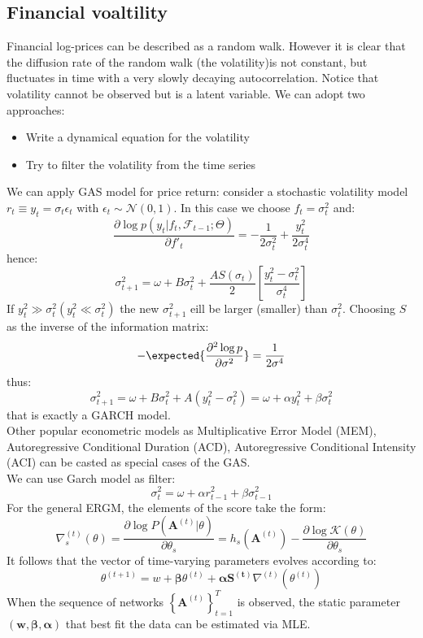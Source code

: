 \subsection{Financial voaltility}
Financial log-prices can be described as a random walk. However it is clear that the diffusion rate of the random walk (the volatility)is not constant, but fluctuates in time with a very slowly decaying autocorrelation. Notice that volatility cannot be observed but is a latent variable. We can adopt two approaches:
\begin{itemize}
	\item Write a dynamical equation for the volatility
	\item Try to filter the volatility from the time series
\end{itemize}
We can apply GAS model for price return: consider a stochastic volatility model $r_t \equiv y_t = \sigma_t \epsilon_t$ with $\epsilon_t \sim \mathcal{N}(0,1)$. In this case we choose $f_t = \sigma_t^2$ and:
\[
\frac{\partial \log p(y_t| f_t, \mathcal{F}_{t-1};\Theta)}{\partial f'_t} = - \frac{1}{2 \sigma^2_t} + \frac{y_t^2}{2 \sigma_t^4}
\]
hence:
\[
\sigma^2_{t+1} = \omega + B \sigma_t^2 + \frac{AS(\sigma_t)}{2}\left[\frac{y_t^2 - \sigma^2_t}{\sigma^4_t}\right]
\]
If $y^2_t\gg \sigma_t^2 (y_t^2 \ll \sigma_t^2)$ the new $\sigma^2_{t+1}$ eill be larger (smaller) than $\sigma_t^2$. Choosing $S$ as the inverse of the information matrix:
\[
- \expected{\frac{\partial^2 \log p}{\partial \sigma^2}} = \frac{1}{2 \sigma^4}
\]
thus:
\[
\sigma^2_{t+1} = \omega + B \sigma_t^2 + A(y_t^2 - \sigma_t^2) = \omega + \alpha y_t^2 + \beta \sigma_t^2
\]
that is exactly a GARCH model.\\
Other popular econometric models as Multiplicative Error Model (MEM), Autoregressive Conditional Duration (ACD), Autoregressive Conditional Intensity (ACI) can be casted as special cases of the GAS.\\
We can use Garch model as filter:
\[
\sigma_t^2 = \omega + \alpha r_{t-1}^2 + \beta \sigma^2_{t-1}
\]
For the general ERGM, the elements of the score take the form:
\[
\nabla^{(t)}_s (\theta) = \frac{\partial \log P \left(\mathbf{A}^{(t)}|\theta\right)}{\partial \theta_s} = h_s \left(\mathbf{A}^{(t)}\right) - \frac{\partial \log \mathcal{K}(\theta)}{\partial \theta_s}
\]
It follows that the vector of time-varying parameters evolves according to:
\[
\theta^{(t+1)} = w + \bm{\beta}\theta^{(t)} + \bm{\alpha}\mathbf{S^{(t)}}\nabla^{(t)} \left(\theta^{(t)}\right)
\]
When the sequence of networks $\left\{\mathbf{A}^{(t)}\right\}^T_{t = 1}$ is observed, the static parameter $(\bm{w,\beta,\alpha})$ that best fit the data can be estimated via MLE.\\
